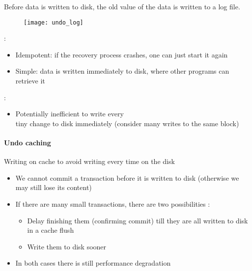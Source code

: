 Before data is written to disk, the old value of the data is written to a log file.

\begin{figure}[H]
    \centering
    \texttt{[image: undo\_log]}
\end{figure}

\begin{minipage}{0.48\textwidth}
 :
\begin{itemize}
    \item Idempotent: if the recovery process crashes, one can just start it again
    \item Simple: data is written immediately to disk, where other programs can retrieve it
\end{itemize}
\end{minipage}
\hfill
\begin{minipage}{0.48\textwidth}
 :
\begin{itemize}
    \item Potentially inefficient to write every\\tiny change to disk immediately (consider many writes to the same block)
\end{itemize}
\end{minipage}

\paragraph{Undo caching}

Writing on cache to avoid writing every time on the disk

\begin{itemize}
    \item We cannot commit a transaction before it is written to disk (otherwise we may still lose its content)
    \item If there are many small transactions, there are two possibilities :
    \begin{itemize}
        \item Delay finishing them (confirming commit) till they are all written to disk in a cache flush
        \item Write them to disk sooner
    \end{itemize}
    \item In both cases there is still performance degradation
\end{itemize}
